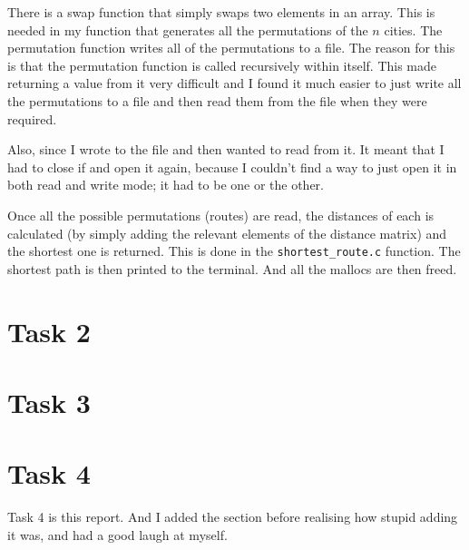 \documentclass{article}
\begin{document}
There is a swap function that simply swaps two elements in an array. This is needed in my function that generates all the permutations of the $n$ cities. The permutation function writes all of the permutations to a file. The reason for this is that the permutation function is called recursively within itself. This made returning a value from it very difficult and I found it much easier to just write all the permutations to a file and then read them from the file when they were required.

Also, since I wrote to the file and then wanted to read from it. It meant that I had to close if and open it again, because I couldn't find a way to just open it in both read and write mode; it had to be one or the other.

Once all the possible permutations (routes) are read, the distances of each is calculated (by simply adding the relevant elements of the distance matrix) and the shortest one is returned. This is done in the \verb!shortest_route.c! function. The shortest path is then printed to the terminal. And all the mallocs are then freed.

\section{Task 2}

\section{Task 3}


\section{Task 4}
Task 4 is this report. And I added the section before realising how stupid adding it was, and had a good laugh at myself.
\end{document}
